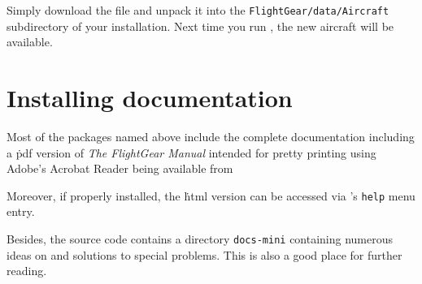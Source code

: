 \medskip
{}
\medskip

Simply download the file and unpack it into the \texttt{FlightGear/data/Aircraft} subdirectory of your installation. Next time you run \FlightGear{}, the new aircraft will be available.

\section{Installing documentation}

Most of the packages named above include the complete \FlightGear{}
documentation including a \.pdf version of \textit{The FlightGear
Manual} intended for pretty printing using Adobe's Acrobat Reader being
available from
 \medskip

 \medskip

 \noindent
 Moreover, if properly installed, the \.html version can be accessed via
\FlightGear{}'s \texttt{help} menu entry.

Besides, the source code contains a directory \texttt{docs-mini} containing numerous
ideas on and solutions to special problems. This is also a good place for further
reading.

